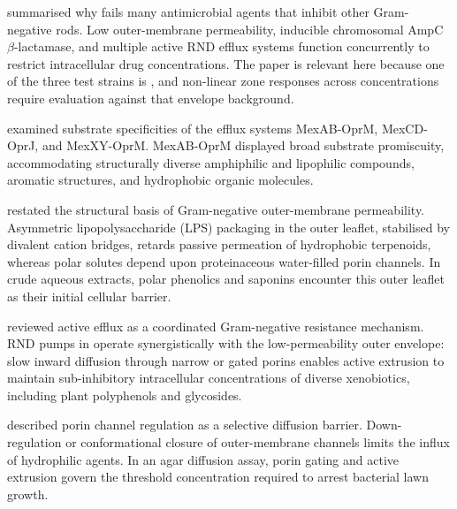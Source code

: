 \citet{hancock2000antibiotic} summarised why  fails many antimicrobial agents that inhibit other Gram-negative rods. Low outer-membrane permeability, inducible chromosomal AmpC $\beta$-lactamase, and multiple active RND efflux systems function concurrently to restrict intracellular drug concentrations. The paper is relevant here because one of the three test strains is , and non-linear zone responses across concentrations require evaluation against that envelope background.

\citet{masuda2000substrate} examined substrate specificities of the  efflux systems MexAB-OprM, MexCD-OprJ, and MexXY-OprM. MexAB-OprM displayed broad substrate promiscuity, accommodating structurally diverse amphiphilic and lipophilic compounds, aromatic structures, and hydrophobic organic molecules.

\citet{nikaido2003molecular} restated the structural basis of Gram-negative outer-membrane permeability. Asymmetric lipopolysaccharide (LPS) packaging in the outer leaflet, stabilised by divalent cation bridges, retards passive permeation of hydrophobic terpenoids, whereas polar solutes depend upon proteinaceous water-filled porin channels. In crude aqueous extracts, polar phenolics and saponins encounter this outer leaflet as their initial cellular barrier.

\citet{poole2005efflux} reviewed active efflux as a coordinated Gram-negative resistance mechanism. RND pumps in  operate synergistically with the low-permeability outer envelope: slow inward diffusion through narrow or gated porins enables active extrusion to maintain sub-inhibitory intracellular concentrations of diverse xenobiotics, including plant polyphenols and glycosides.

\citet{pages2008porin} described porin channel regulation as a selective diffusion barrier. Down-regulation or conformational closure of outer-membrane channels limits the influx of hydrophilic agents. In an agar diffusion assay, porin gating and active extrusion govern the threshold concentration required to arrest bacterial lawn growth.

